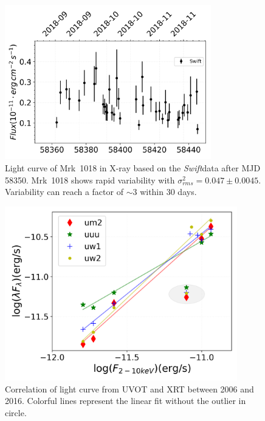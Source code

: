 \documentclass[twocolumn]{aastex63}
\newcommand{\xmm}{{\em XMM-Newton}}
\newcommand{\nustar}{{\em NuSTAR }}
\newcommand{\chandra}{{\em Chandra}}
\newcommand{\swift}{{\em Swift}}
\begin{document}


\begin{figure}
\centering
	\includegraphics[width=0.8\textwidth]{./pic/subplots-xrt_uvot-radio-second-right-part.png}
    \caption{Light curve of Mrk~1018 in X-ray based on the \swift data after MJD 58350. Mrk~1018 shows rapid variability with $\sigma^2_{rms} = 0.047 \pm 0.0045 $. Variability can reach a factor of $\sim3$ within 30 days.}
    \label{fig:x-ray-lc-rp-secondaxis}
\end{figure}


\begin{figure}
\centering
	\includegraphics[width=0.9\textwidth]{./pic/uvot_xrt_correlation-fig-without-outlier.png}
    \caption{Correlation of light curve from UVOT and XRT  between 2006 and 2016. Colorful lines represent the linear fit without the outlier in circle.}
    \label{fig:correlation-uvot-xray}
\end{figure}
\end{document}
